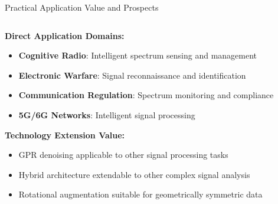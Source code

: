 \documentclass[aspectratio=169]{beamer}
\begin{document}
\begin{frame}{Practical Application Value and Prospects}
\begin{columns}
\begin{column}{0.6\textwidth}
\textbf{Direct Application Domains:}
\begin{itemize}
\item \textbf{Cognitive Radio}: Intelligent spectrum sensing and management
\item \textbf{Electronic Warfare}: Signal reconnaissance and identification
\item \textbf{Communication Regulation}: Spectrum monitoring and compliance
\item \textbf{5G/6G Networks}: Intelligent signal processing
\end{itemize}

\textbf{Technology Extension Value:}
\begin{itemize}
\item GPR denoising applicable to other signal processing tasks
\item Hybrid architecture extendable to other complex signal analysis
\item Rotational augmentation suitable for geometrically symmetric data
\end{itemize}
\end{column}
\begin{column}{0.4\textwidth}
\end{column}
\end{columns}
\end{frame}
\end{document}

